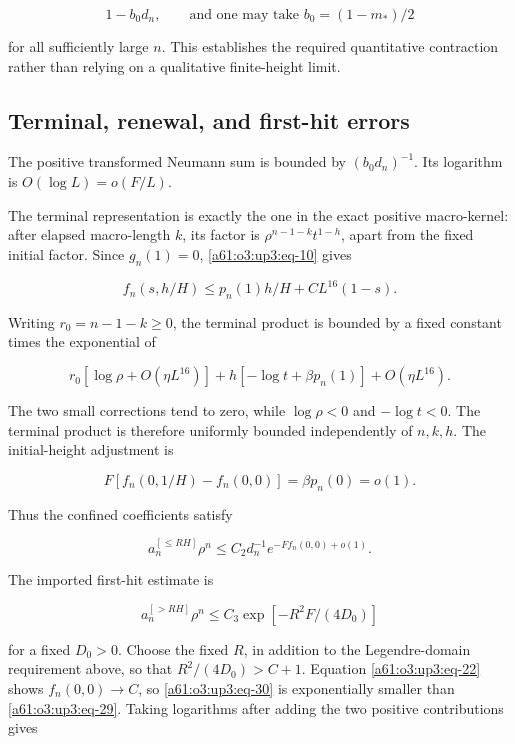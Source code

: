 \documentclass[11pt,letterpaper]{article}
\numberwithin{equation}{section}
\theoremstyle{remark}\newtheorem{remark}[theorem]{Remark}
\begin{document}
\begin{equation}
1-b_0d_n,\qquad
\text{and one may take } b_0=(1-m_*)/2
\label{a61:o3:up3:eq-28}
\end{equation}

for all sufficiently large \(n\). This establishes the required
quantitative contraction rather than relying on a qualitative
finite-height limit.

\subsection{Terminal, renewal, and first-hit errors}

The positive transformed Neumann sum is bounded by \((b_0d_n)^{-1}\).
Its logarithm is \(O(\log L)=o(F/L)\).

The terminal representation is exactly the one in the exact positive
macro-kernel: after elapsed macro-length \(k\), its factor is
\(\rho^{n-1-k}t^{1-h}\), apart from the fixed initial factor. Since
\(g_n(1)=0\), \eqref{a61:o3:up3:eq-10} gives

\[
f_n(s,h/H)\le p_n(1)h/H+CL^{16}(1-s).
\]

Writing \(r_0=n-1-k\ge0\), the terminal product is bounded by a fixed
constant times the exponential of

\[
r_0[\log\rho+O(\eta L^{16})]
+h[-\log t+\beta p_n(1)]+O(\eta L^{16}).
\]

The two small corrections tend to zero, while \(\log\rho<0\) and
\(-\log t<0\). The terminal product is therefore uniformly bounded
independently of \(n,k,h\). The initial-height adjustment is

\[
F[f_n(0,1/H)-f_n(0,0)]=\beta p_n(0)=o(1).
\]

Thus the confined coefficients satisfy

\begin{equation}
a_n^{[\le RH]}\rho^n\le C_2d_n^{-1}e^{-Ff_n(0,0)+o(1)}.
\label{a61:o3:up3:eq-29}
\end{equation}

The imported first-hit estimate is

\begin{equation}
a_n^{[>RH]}\rho^n\le C_3\exp[-R^2F/(4D_0)]
\label{a61:o3:up3:eq-30}
\end{equation}

for a fixed \(D_0>0\). Choose the fixed \(R\), in addition to the
Legendre-domain requirement above, so that \(R^2/(4D_0)>C+1\). Equation
\eqref{a61:o3:up3:eq-22} shows \(f_n(0,0)\to C\), so \eqref{a61:o3:up3:eq-30} is
exponentially smaller than \eqref{a61:o3:up3:eq-29}. Taking logarithms after
adding the two positive contributions gives
\end{document}
